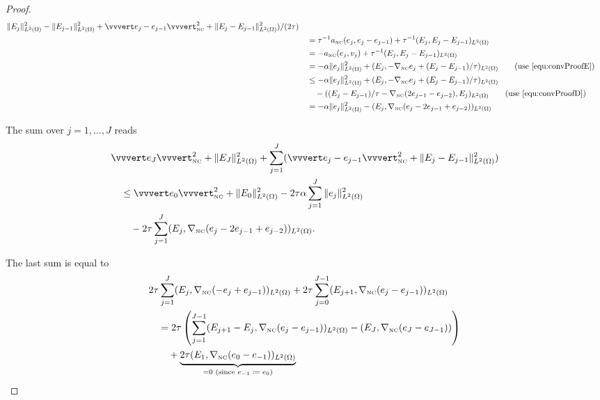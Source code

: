 \begin{proof}
\begin{align*}
    \Vert E_j \Vert_{L^2(\Omega)}^2 - \Vert E_{j-1}\Vert_{L^2(\Omega)}^2 +
    \vvvert e_j-e_{j-1}\vvvert_\nc^2 +
    \Vert E_j - E_{j-1} \Vert_{L^2(\Omega)}^2)/(2\tau) \\
    &\quad =
    \tau^{-1}a_\nc(e_j,e_j-e_{j-1}) + \tau^{-1}(E_j,E_j-E_{j-1})_{L^2(\Omega)}\\
    &\quad =
    -a_\nc(e_j,v_j) + \tau^{-1}(E_j,E_j-E_{j-1})_{L^2(\Omega)}\\
    &\quad =
    -\alpha\Vert e_j\Vert_{L^2(\Omega)}^2 + (E_j,
    -\nabla_\nc e_j+(E_j-E_{j-1})/\tau)_{L^2(\Omega)} 
    \tag{use \eqref{equ:convProofE}}\\
    &\quad \leq
    -\alpha\Vert e_j\Vert_{L^2(\Omega)}^2 + (E_j,
    -\nabla_\nc e_j+(E_j-E_{j-1})/\tau)_{L^2(\Omega)}\\ 
    &\quad\quad -( (E_j-E_{j-1})/\tau -\gradnc(2e_{j-1}-e_{j-2}),E_j)_{L^2(\Omega)}
    \tag{use \eqref{equ:convProofD}}\\
    &\quad =
    -\alpha\Vert e_j\Vert_{L^2(\Omega)}^2 - 
    (E_j,\gradnc(e_j-2e_{j-1}+e_{j-2}))_{L^2(\Omega)}
  \end{align*}

  \noindent The sum over $j=1,\ldots,J$ reads
  \begin{align}
    \label{equ:convProofF}
    &\vvvert e_J \vvvert^2_\nc +\Vert E_J \Vert_{L^2(\Omega)}^2 
    +\sum_{j=1}^J(\vvvert e_j-e_{j-1} \vvvert_\nc^2 + 
    \Vert E_j-E_{j-1}\Vert_{L^2(\Omega)}^2)\notag \\
    &\quad \leq 
    \vvvert e_0 \vvvert_\nc^2 + \Vert E_0 \Vert_{L^2(\Omega)}^2 
    -2\tau\alpha\sum_{j=1}^J \Vert e_j\Vert^2_{L^2(\Omega)}\notag \\
    &\quad\quad
    -2\tau \sum_{j=1}^J(E_j,\gradnc (e_j-2e_{j-1}+e_{j-2}))_{L^2(\Omega)}.
  \end{align}

  \noindent The last sum is equal to
  \begin{align*}
    &2\tau\sum_{j=1}^J(E_j,\nabla_{\textup{\tiny NC}}(-e_j+e_{j-1}))_{L^2(\Omega)} +
    2\tau\sum_{j=0}^{J-1}(E_{j+1},\nabla_{\textup{\tiny NC}}(e_j-e_{j-1}))_{L^2(\Omega)} \\
    &\quad = 
    2\tau\left( 
    \sum_{j=1}^{J-1} 
    (E_{j+1}-E_j,\nabla_{\textup{\tiny NC}}(e_j-e_{j-1}))_{L^2(\Omega)}
    -(E_J,\nabla_{\textup{\tiny NC}}(e_J-e_{J-1}))\right)\\
    &\quad\quad +
    \underbrace{2\tau(E_1,
    \nabla_{\textup{\tiny NC}}(e_0-e_{-1}))_{L^2(\Omega)}}_{=0 \text{ (since 
    $e_{-1}\coloneqq e_0$)}}
  \end{align*}


\end{proof}
